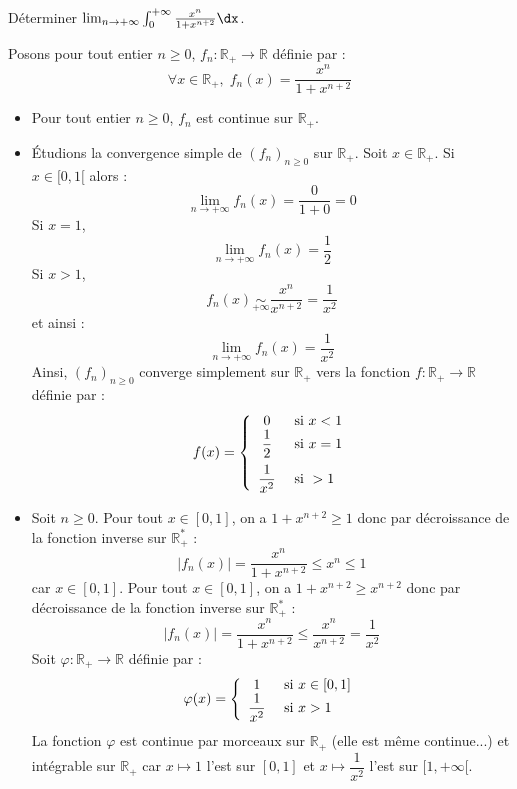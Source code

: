 \documentclass[a4paper,10pt]{report}
\begin{document}
\begin{Exercice}{} Déterminer $\lim_{n \rightarrow + \infty}\int_{0}^{ + \infty} \frac{x^{n}}{1 + x^{n + 2}} \dx$.
\end{Exercice}

\corr Posons pour tout entier $n \geq 0$, $f_n : \mathbb{R}_+ \rightarrow \mathbb{R}$ définie par :
$$ \forall x \in \mathbb{R}_+, \; f_n(x) = \frac{x^{n}}{1 + x^{n + 2}}$$
\begin{itemize}
\item Pour tout entier $n \geq 0$, $f_n$ est continue sur $\mathbb{R}_+$.
\item Étudions la convergence simple de $(f_n)_{n \geq 0}$ sur $\mathbb{R}_+$. Soit $x \in \mathbb{R}_+$. Si $x \in [0,1[$ alors :
$$ \lim_{n \rightarrow + \infty} f_n(x)= \dfrac{0}{1+0} = 0$$
Si $x=1$,
$$ \lim_{n \rightarrow + \infty} f_n(x)= \dfrac{1}{2}$$
Si $x>1$,
$$ f_n(x) \underset{+ \infty}{\sim} \dfrac{x^n}{x^{n+2}} = \dfrac{1}{x^2}$$
et ainsi :
$$ \lim_{n \rightarrow + \infty} f_n(x) = \dfrac{1}{x^2}$$
Ainsi, $(f_n)_{n \geq 0}$ converge simplement sur $\mathbb{R}_+$ vers la fonction $f : \mathbb{R}_+ \rightarrow \mathbb{R}$ définie par :
$$ f(x) = \left\lbrace \begin{array}{cl}
0 & \hbox{ si } x<1 \\
\dfrac{1}{2} & \hbox{ si } x=1 \\[0.3cm]
\dfrac{1}{x^2} & \hbox{ si } >1  
\end{array}\right.$$
\item Soit $n \geq 0$. Pour tout $x \in [0,1]$, on a $1+x^{n+2}\geq 1$ donc par décroissance de la fonction inverse sur $\mathbb{R}_+^*$ :
$$ \left\vert f_n(x) \right\vert = \dfrac{x^n}{1+x^{n+2}} \leq  x^n \leq 1$$
car $x \in [0,1]$. Pour tout $x \in [0,1]$, on a $1+x^{n+2}\geq x^{n+2}$ donc par décroissance de la fonction inverse sur $\mathbb{R}_+^*$ :
$$ \left\vert f_n(x) \right\vert = \dfrac{x^n}{1+x^{n+2}} \leq \dfrac{x^n}{x^{n+2}}= \dfrac{1}{x^2}$$
Soit $\varphi : \mathbb{R}_+ \rightarrow \mathbb{R}$ définie par :
$$ \varphi(x) = \left\lbrace \begin{array}{cl}
1 & \hbox{ si } x \in [0,1] \\
\dfrac{1}{x^2} & \hbox{ si } x>1 \\
\end{array}\right.$$
La fonction $\varphi$ est continue par morceaux sur $\mathbb{R}_+$ (elle est même continue...) et intégrable sur $\mathbb{R}_+$ car $x \mapsto 1$ l'est sur $[0,1]$ et $x \mapsto \dfrac{1}{x^2}$ l'est sur $[1, + \infty[$. 
\end{itemize}
\end{document}
